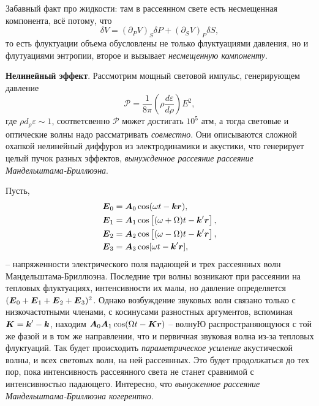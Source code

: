 Забавный факт про жидкости: там в рассеянном свете есть несмещенная компонента, всё потому, что
\begin{equation*}
    \delta V = (\partial_P V)_S \delta P + (\partial_S V)_P \delta S,
\end{equation*}
то есть флуктуации объема обусловлены не только флуктуациями давления, но и флутуациями энтропии, второе и вызывает \textit{несмещенную компоненту}. 




\textbf{Нелинейный эффект}. Рассмотрим мощный световой импульс, генерирующем давление
\begin{equation*}
    \mathcal P = \frac{1}{8 \pi} \left(\rho \frac{d \varepsilon}{d \rho} \right)E^2,
\end{equation*}
где $\rho d_\rho \varepsilon \sim 1$, соответсвенно $\mathcal P$ может достигать $10^5$ атм, а тогда световые и оптические волны надо рассматривать \textit{совместно}. Они описываются сложной охапкой нелинейный диффуров из электродинамики и акустики, что генерирует целый пучок разных эффектов, \textit{вынужденное рассеяние рассеяние Мандельштама-Бриллюэна}. 


Пусть, 
\begin{align*}
    \mbox{\boldmath $E$}_0 &= \mbox{\boldmath $A$}_0 \cos (\omega t - \mbox{\boldmath $k$}  \mbox{\boldmath $r$}), \\
    \mbox{\boldmath $E$}_1 &= \mbox{\boldmath $A$}_1 \cos \left[(\omega + \Omega) t - \mbox{\boldmath $k$}' \mbox{\boldmath $r$}\right], \\
    \mbox{\boldmath $E$}_2 &= \mbox{\boldmath $A$}_2 \cos\left[(\omega-\Omega)t - \mbox{\boldmath $k$}'\mbox{\boldmath $r$}\right], \\
    \mbox{\boldmath $E$}_3 &= \mbox{\boldmath $A$}_3 \cos[\omega t - \mbox{\boldmath $k$}' \mbox{\boldmath $r$}],
\end{align*}
-- напряженности электрического поля падающей и трех рассеянных волн Мандельштама-Бриллюэна. Последние три волны возникают при рассеянии на тепловых флуктуациях, интенсивности их малы, но давление определяется $(\mbox{\boldmath $E$}_0 + \mbox{\boldmath $E$}_1 + \mbox{\boldmath $E$}_2 + \mbox{\boldmath $E$}_3)^2$. Однако возбуждение звуковых волн связано только с низкочастотными членами, с косинусами разностных аргументов, вспоминая $\mbox{\boldmath $K$} = \mbox{\boldmath $k$}' - \mbox{\boldmath $k$}$, находим $\mbox{\boldmath $A$}_0 \mbox{\boldmath $A$}_1 \cos (\Omega t - \mbox{\boldmath $K$} \mbox{\boldmath $r$})$ -- волнуЮ распространяющуюся с той же фазой и в том же направлении, что и первичная звуковая волна из-за тепловых флуктуаций. Так будет происходить \textit{параметрическое усиление} акустической волны, и всех световых волн, на ней рассеянных. Это будет продолжаться до тех пор, пока интенсивность рассеянного света не станет сравнимой с интенсивностью падающего. Интересно, что \textit{вынуженное рассеяние Мандельштама-Бриллюэна когерентно}. 





